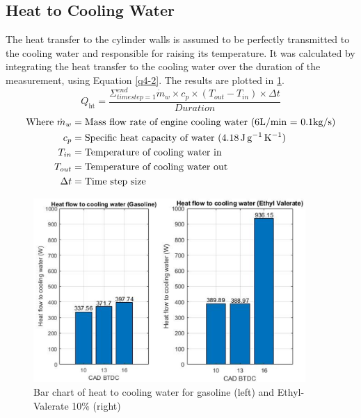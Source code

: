 \documentclass[11pt]{article}
\begin{document}
\subsection*{Heat to Cooling Water}
The heat transfer to the cylinder walls is assumed to be perfectly transmitted to the cooling water and responsible for raising its temperature. It was calculated by integrating the heat transfer to the cooling water over the duration of the measurement, using Equation \ref{q4-2}. The results are plotted in \ref{q4-f3}.
\begin{equation}
Q_\textrm{ht} = \frac{\Sigma^{end}_{time step=1} \dot{m}_w \times c_p \times (T_{out} - T_{in}) \times \Delta t}{Duration} \label{q4-2}
\end{equation}
\begin{align*}
\textrm{Where }
\dot{m}_w	&= \textrm{Mass flow rate of engine cooling water (6L/min = 0.1kg/s)}\\
c_p 		&= \textrm{Specific heat capacity of water (\SI{4.18}{\joule\per\gram\per\kelvin})}\\ %
T_{in}		&= \textrm{Temperature of cooling water in}\\ 
T_{out}		&= \textrm{Temperature of cooling water out}\\
\Delta t	&= \textrm{Time step size}
\end{align*}
\begin{figure}[H]
	\centering
    \includegraphics[height = 7cm]{./img/diagram18.png}
    \caption{Bar chart of heat to cooling water for gasoline (left) and Ethyl-Valerate 10\% (right)}
    \label{q4-f3}
\end{figure}
\end{document}
